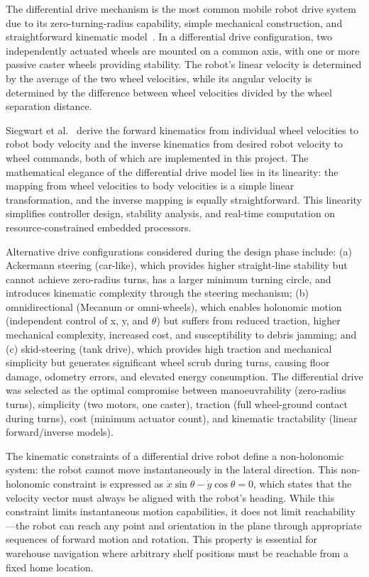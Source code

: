 \documentclass[12pt,a4paper,oneside]{report}
\begin{document}
The differential drive mechanism is the most common mobile robot drive system due to its zero-turning-radius capability, simple mechanical construction, and straightforward kinematic model~\cite{siegwart2011}. In a differential drive configuration, two independently actuated wheels are mounted on a common axis, with one or more passive caster wheels providing stability. The robot's linear velocity is determined by the average of the two wheel velocities, while its angular velocity is determined by the difference between wheel velocities divided by the wheel separation distance.

Siegwart et al.~\cite{siegwart2011} derive the forward kinematics from individual wheel velocities to robot body velocity and the inverse kinematics from desired robot velocity to wheel commands, both of which are implemented in this project. The mathematical elegance of the differential drive model lies in its linearity: the mapping from wheel velocities to body velocities is a simple linear transformation, and the inverse mapping is equally straightforward. This linearity simplifies controller design, stability analysis, and real-time computation on resource-constrained embedded processors.

Alternative drive configurations considered during the design phase include: (a) Ackermann steering (car-like), which provides higher straight-line stability but cannot achieve zero-radius turns, has a larger minimum turning circle, and introduces kinematic complexity through the steering mechanism; (b) omnidirectional (Mecanum or omni-wheels), which enables holonomic motion (independent control of x, y, and $\theta$) but suffers from reduced traction, higher mechanical complexity, increased cost, and susceptibility to debris jamming; and (c) skid-steering (tank drive), which provides high traction and mechanical simplicity but generates significant wheel scrub during turns, causing floor damage, odometry errors, and elevated energy consumption. The differential drive was selected as the optimal compromise between manoeuvrability (zero-radius turns), simplicity (two motors, one caster), traction (full wheel-ground contact during turns), cost (minimum actuator count), and kinematic tractability (linear forward/inverse models).

The kinematic constraints of a differential drive robot define a non-holonomic system: the robot cannot move instantaneously in the lateral direction. This non-holonomic constraint is expressed as $\dot{x}\sin\theta - \dot{y}\cos\theta = 0$, which states that the velocity vector must always be aligned with the robot's heading. While this constraint limits instantaneous motion capabilities, it does not limit reachability---the robot can reach any point and orientation in the plane through appropriate sequences of forward motion and rotation. This property is essential for warehouse navigation where arbitrary shelf positions must be reachable from a fixed home location.
\end{document}
